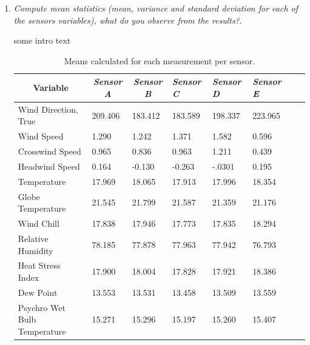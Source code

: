 \documentclass[a4paper,12pt]{article} %
\begin{document}
\begin{enumerate}

\item {\it Compute mean statistics (mean, variance and standard deviation for each of the sensors variables), what do you observe from the results?}. %

some intro text

\begin{table}[H]
\centering
\caption{Means calculated for each measurement per sensor.}
\begin{tabular}{llllllll}
\multicolumn{1}{c}{\textbf{Variable}} & \multicolumn{1}{c}{\textit{Sensor A}} & \multicolumn{1}{c}{\textit{Sensor B}} & \textit{Sensor C} & \textit{Sensor D} & \textit{Sensor E}  \\ \hline
Wind Direction, True                  & 209.406               & 183.412               & 183.589             & 198.337            & 223.965 \\
Wind Speed             & 1.290                                 &1.242                     & 1.371             & 1.582            & 0.596 \\
Crosswind Speed             &0.965          &0.836                     & 0.963             & 1.211            & 0.439 \\
Headwind Speed             &0.164          &-0.130                     & -0.263             & -.0301            & 0.195 \\
Temperature             &17.969          &18.065                     &17.913             &17.996            & 18.354 \\
Globe Temperature             &21.545          &21.799                     &21.587             &21.359            &21.176 \\
Wind Chill             &17.838          &17.946                     &17.773             &17.835            & 18.294 \\
Relative Humidity             &78.185          &77.878                     &77.963             &77.942            & 76.793 \\
Heat Stress Index             &17.900          &18.004                     &17.828             &17.921            & 18.386 \\
Dew Point             &13.553          &13.531                     &13.458             &13.509            & 13.559 \\
Psychro Wet Bulb Temperature             &15.271          &15.296                     &15.197             &15.260            & 15.407 \\

\end{tabular}
\end{table}
\end{enumerate}
\end{document}
